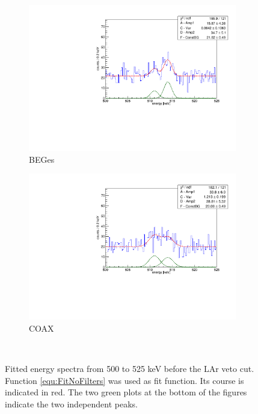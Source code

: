 \documentclass[encoding=utf8,british]{tumphthesis}
\begin{document}
\begin{figure}[t!]
	\centering
	\begin{subfigure}{.5\textwidth}
		\centering
		\includegraphics[width=\textwidth]{./Bilder/500525FitNoFilterBEGes.pdf}
		\caption{BEGes}
		\label{fig:FitNoFilterBEGes}
	\end{subfigure}\hfill%
	\begin{subfigure}{.5\textwidth}
		\centering
		\includegraphics[width=\textwidth]{./Bilder/500525FitNoFilterCOAX.pdf}
		\caption{COAX}
		\label{fig:FitNoFilterCOAX}
	\end{subfigure}
    \\
	\caption{
		Fitted energy spectra from 500 to 525 keV before the LAr veto cut. 
		Function \ref{equ:FitNoFilters} was used as fit function. 
		Its course is indicated in red. 
		The two green plots at the bottom of the figures indicate the two independent peaks. 
		}
				\vspace{5mm}
\end{figure}
\\
\end{document}
